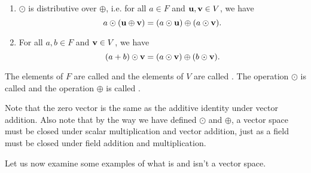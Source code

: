 \begin{defn}
\begin{enumerate}
    \item\label{axiom:vect7} $ \odot $ is distributive over $ \oplus $, i.e. for all $ a\in F $ and $ \mathbf{u},\mathbf{v}\in V $, we have
    \begin{equation*}
        a\odot(\mathbf{u}\oplus\mathbf{v})=(a\odot\mathbf{u})\oplus(a\odot\mathbf{v}).
    \end{equation*}

    \item\label{axiom:vect8} For all $ a,b\in F $ and $ \mathbf{v}\in V $, we have
    \begin{equation*}
        (a+b)\odot\mathbf{v}=(a\odot\mathbf{v})\oplus(b\odot\mathbf{v}).
    \end{equation*}
\end{enumerate}

The elements of $ F $ are called  and the elements of $ V $ are called . The operation $ \odot $ is called  and the operation $ \oplus $ is called .
\end{defn}

Note that the zero vector is the same as the additive identity under vector addition. Also note that by the way we have defined $ \odot $ and $ \oplus $, a vector space must be closed under scalar multiplication and vector addition, just as a field must be closed under field addition and multiplication.

Let us now examine some examples of what is and isn't a vector space.


